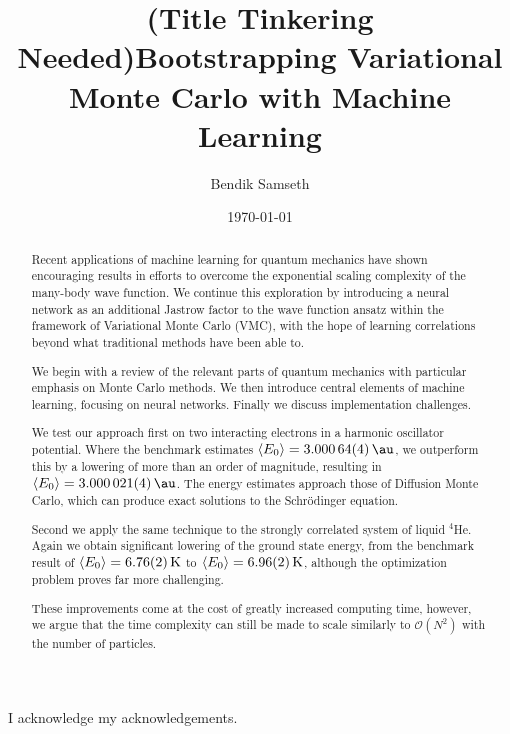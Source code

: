 \documentclass[twoside,english]{uiofysmaster}
\author{Bendik Samseth}
\title{(Title Tinkering Needed)Bootstrapping Variational Monte Carlo with Machine Learning}
\date{\monthyeardate\today}
\begin{document}
\maketitle

\begin{abstract}
Recent applications of machine learning for quantum mechanics have shown
encouraging results in efforts to overcome the exponential scaling complexity of
the many-body wave function. We continue this exploration by introducing a
neural network as an additional Jastrow factor to the wave function ansatz
within the framework of Variational Monte Carlo (VMC), with the hope of learning
correlations beyond what traditional methods have been able to.

We begin with a review of the relevant parts of quantum mechanics with particular
emphasis on Monte Carlo methods. We then introduce central elements of machine
learning, focusing on neural networks. Finally we discuss implementation
challenges.

We test our approach first on two interacting electrons in a harmonic oscillator
potential. Where the benchmark estimates $\expval{E_0}=\SI{3.00064(4)}{\au}$, we
outperform this by a lowering of more than an order of magnitude, resulting in
$\expval{E_0}=\SI{3.000021(4)}{\au}$. The energy estimates approach those of
Diffusion Monte Carlo, which can produce exact solutions to the Schrödinger equation.

Second we apply the same technique to the strongly correlated system of liquid
$^4$He. Again we obtain significant lowering of the ground state energy, from
the benchmark result of $\expval{E_0}=\SI{6.76(2)}{\kelvin}$ to
$\expval{E_0}=\SI{6.96(2)}{\kelvin}$, although the optimization problem proves far
more challenging.

These improvements come at the cost of greatly increased computing time,
however, we argue that the time complexity can still be made to scale similarly to
$\mathcal{O}(N^2)$ with the number of particles.
\end{abstract}

\begin{acknowledgements}
  I acknowledge my acknowledgements.
\end{acknowledgements}

\tableofcontents

\listoffigures
\begingroup
\let\clearpage\relax
\listoftables
\endgroup


\end{document}
